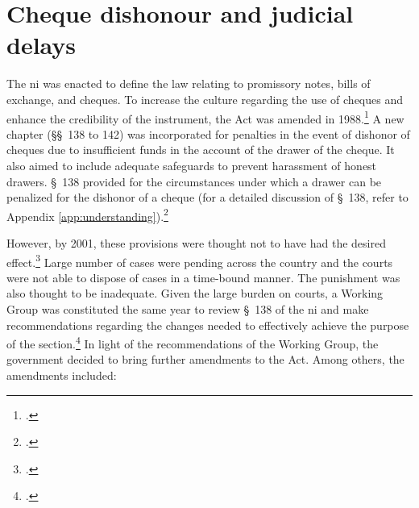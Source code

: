 \documentclass[12pt,a4paper]{article}
\begin{document}
	
	
	\section{Cheque dishonour and judicial delays} \label{sec:history}
	
	The \acrlong{ni} was enacted to define the law relating to promissory notes, bills of exchange, and cheques. To increase the culture regarding the use of cheques and enhance the credibility of the instrument, the Act was amended in 1988.\footcite{niAmend1988} A new chapter (\S\S~138 to 142) was incorporated for penalties in the event of dishonor of cheques due to insufficient funds in the account of the drawer of the cheque. It also aimed to include adequate safeguards to prevent harassment of honest drawers. \S~138 provided for the circumstances under which a drawer can be penalized for the dishonor of a cheque (for a detailed discussion of \S~138, refer to Appendix \ref{app:understanding}).\footcite{ind1881_niAct} 
	
	
	However, by 2001, these provisions were thought not to have had the desired effect.\footcite{stdcomm2001_138niAct} Large number of cases were pending across the country and the courts were not able to dispose of cases in a time-bound manner. The punishment was also thought to be inadequate. Given the large burden on courts, a Working Group was constituted the same year to review \S~138 of the \gls{ni} and make recommendations regarding the changes needed to effectively achieve the purpose of the section.\footcite{wg2001_138} In light of the recommendations of the Working Group, the government decided to bring further amendments to the Act. Among others, the amendments included:
	
\end{document}
